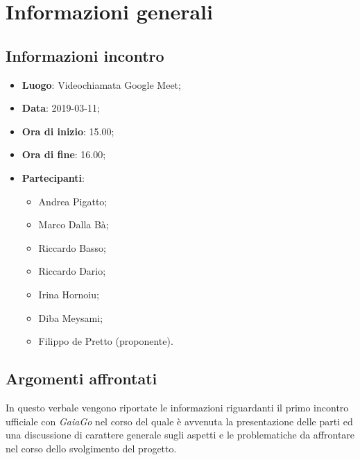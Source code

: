 \section{Informazioni generali}

\subsection{Informazioni incontro}
\begin{itemize}
\item \textbf{Luogo}: Videochiamata Google Meet;
\item \textbf{Data}: 2019-03-11;
\item \textbf{Ora di inizio}: 15.00;
\item \textbf{Ora di fine}: 16.00;
\item \textbf{Partecipanti}: 
\begin{itemize}
	\item Andrea Pigatto;
	\item Marco Dalla Bà;
	\item Riccardo Basso;
	\item Riccardo Dario;
	\item Irina Hornoiu;
	\item Diba Meysami;
	\item Filippo de Pretto (proponente).
\end{itemize}
\end{itemize}

\subsection{Argomenti affrontati}
In questo verbale vengono riportate le informazioni riguardanti il primo incontro ufficiale con \textit{GaiaGo} nel corso del quale è avvenuta la presentazione delle parti ed una discussione di carattere generale sugli aspetti e le problematiche da affrontare nel corso dello svolgimento del progetto.
